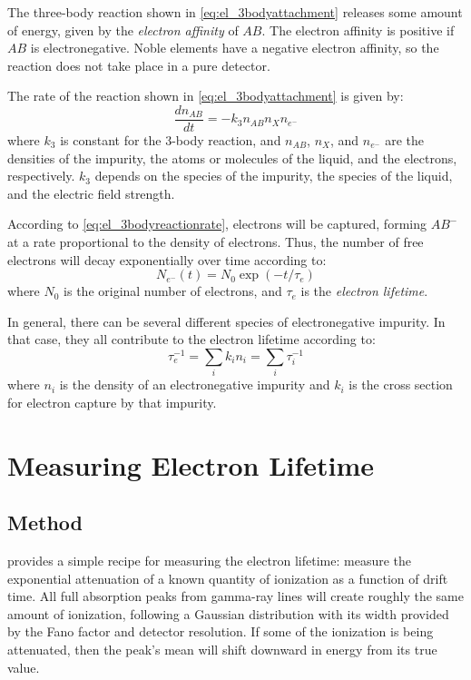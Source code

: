 \documentclass[herrin-thesis.tex]{subfiles}
\begin{document}
The three-body reaction shown in \cref{eq:el_3bodyattachment} releases some amount of energy, given by the \emph{electron affinity} of \(AB\). The electron affinity is positive if \(AB\) is electronegative. Noble elements have a negative electron affinity, so the reaction does not take place in a pure detector.

The rate of the reaction shown in \cref{eq:el_3bodyattachment} is given by:
\begin{equation}
\frac{dn_{AB}}{dt} = -k_{3} n_{AB} n_{X} n_{e^{-}}
\label{eq:el_3bodyreactionrate}
\end{equation}
where \(k_3\) is constant for the 3-body reaction, and \(n_{AB}\), \(n_{X}\), and \(n_{e^{-}}\) are the densities of the impurity, the atoms or molecules of the liquid, and the electrons, respectively. \(k_3\) depends on the species of the impurity, the species of the liquid, and the electric field strength.

According to \cref{eq:el_3bodyreactionrate}, electrons will be captured, forming \(AB^{-}\) at a rate proportional to the density of electrons. Thus, the number of free electrons will decay exponentially over time according to:
\begin{equation}
N_{e^{-}}(t) = N_0 \exp (-t/\tau_e)
\label{eq:el_exponentialtaue}
\end{equation}
where \(N_0\) is the original number of electrons, and \(\tau_e\) is the \emph{electron lifetime}.

In general, there can be several different species of electronegative impurity. In that case, they all contribute to the electron lifetime according to:
\begin{equation}
\tau_e^{-1} = \sum_i k_i n_i = \sum_i\tau_i^{-1}
\label{eq:el_tauedefinition}
\end{equation}
where \(n_i\) is the density of an electronegative impurity and \(k_i\) is the cross section for electron capture by that impurity.

\section{Measuring Electron Lifetime}

\subsection{Method}
 provides a simple recipe for measuring the electron lifetime: measure the exponential attenuation of a known quantity of ionization as a function of drift time. All full absorption peaks from gamma-ray lines will create roughly the same amount of ionization, following a Gaussian distribution with its width provided by the Fano factor and detector resolution. If some of the ionization is being attenuated, then the peak's mean will shift downward in energy from its true value.
\end{document}
